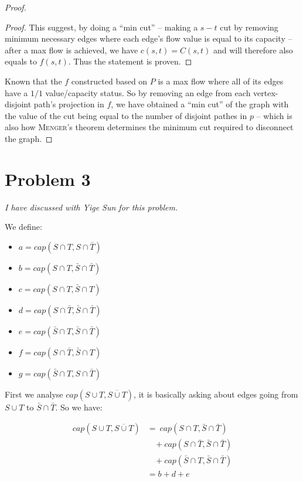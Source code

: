 \documentclass[11pt]{article}
\begin{document}
\begin{proof}
\begin{adjustwidth}{1cm}{}
\begin{proof}
    This suggest, by doing a ``min cut'' -- making a $s-t$ cut by removing minimum necessary edges where each edge's flow value is equal to its capacity -- after a max flow is achieved, we have $c(s, t) = C(s, t)$ and will therefore also equals to $f(s, t)$. Thus the statement is proven.


    \end{proof}

    \end{adjustwidth}



Known that the $f$ constructed based on $P$ is a max flow where all of its edges have a $1/1$ value/capacity status. So by removing an edge from each vertex-disjoint path's projection in $f$, we have obtained a ``min cut'' of the graph with the value of the cut being equal to the number of disjoint pathes in $p$ -- which is also how \textsc{Menger}'s theorem determines the minimum cut required to disconnect the graph.

\end{proof}

\section*{Problem 3}

\textit{I have discussed with Yige Sun for this problem.}\newline

We define:
\begin{itemize}
    \item $a = cap(S \cap T, S \cap \bar{T})$
    \item $b = cap(S \cap T, \bar{S} \cap \bar{T})$
    \item $c = cap(S \cap T, \bar{S} \cap T)$
    \item $d = cap(S \cap \bar{T}, \bar{S} \cap \bar{T})$
    \item $e = cap(\bar{S} \cap T, \bar{S} \cap \bar{T})$
    \item $f = cap(S \cap \bar{T}, \bar{S} \cap T)$
    \item $g = cap(\bar{S} \cap T, S \cap \bar{T})$
\end{itemize}

First we analyse $cap(S \cup T, \overline{S \cup T})$, it is basically asking about edges going from $S \cup T$ to $\bar{S} \cap \bar{T}$. So we have:

\begin{align*}
    cap(S \cup T, \overline{S \cup T}) &= \  cap(S \cap T, \bar{S} \cap \bar{T})\\
    & \ \ \ \ + cap(S \cap \bar{T}, \bar{S} \cap \bar{T}) \\
    & \ \ \ \ + cap(\bar{S} \cap T, \bar{S} \cap \bar{T}) \\
    &= b + d + e
\end{align*}
\end{document}
